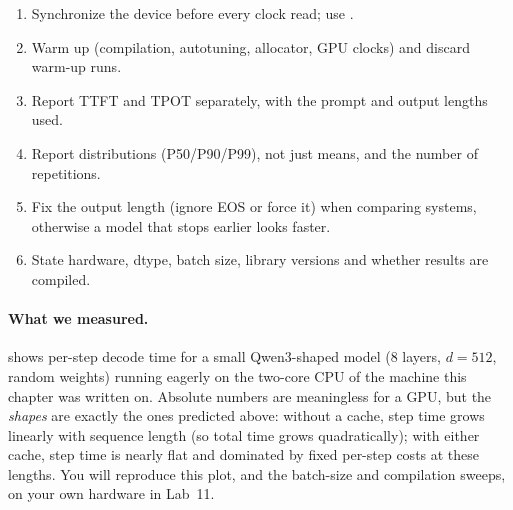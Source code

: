 \begin{keyidea}
\begin{enumerate}
  \item Synchronize the device before every clock read; use .
  \item Warm up (compilation, autotuning, allocator, GPU clocks) and discard warm-up runs.
  \item Report TTFT and TPOT separately, with the prompt and output lengths used.
  \item Report distributions (P50/P90/P99), not just means, and the number of repetitions.
  \item Fix the output length (ignore EOS or force it) when comparing systems, otherwise a model
    that stops earlier looks faster.
  \item State hardware, dtype, batch size, library versions and whether results are compiled.
\end{enumerate}
\end{keyidea}

\paragraph{What we measured.}  shows per-step decode time for a small
Qwen3-shaped model (8 layers, $d=512$, random weights) running eagerly on the two-core CPU of the
machine this chapter was written on. Absolute numbers are meaningless for a GPU, but the
\emph{shapes} are exactly the ones predicted above: without a cache, step time grows linearly with
sequence length (so total time grows quadratically); with either cache, step time is nearly flat
and dominated by fixed per-step costs at these lengths. You will reproduce this plot, and the
batch-size and compilation sweeps, on your own hardware in Lab~11.

